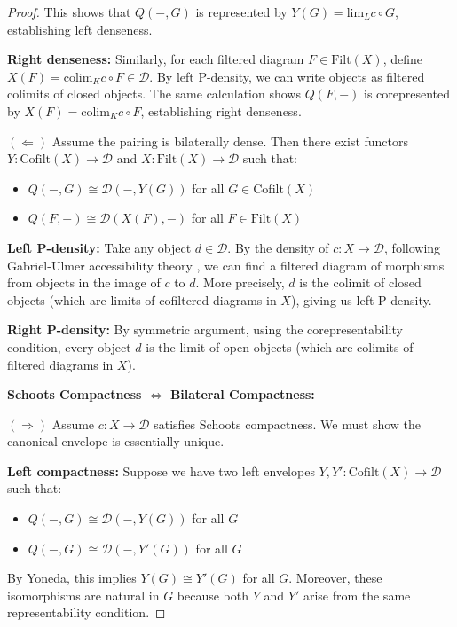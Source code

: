 \documentclass[11pt]{article}
\theoremstyle{plain}
\theoremstyle{definition}
\theoremstyle{remark}
\newcommand{\colim}{\mathrm{colim}}
\renewcommand{\lim}{\mathrm{lim}}
\begin{document}
\begin{proof}
This shows that $Q(-, G)$ is represented by $Y(G) = \lim_L c \circ G$, establishing left denseness.

\textbf{Right denseness:} Similarly, for each filtered diagram $F \in \mathrm{Filt}(X)$, define $X(F) = \colim_K c \circ F \in \mathcal{D}$. By left P-density, we can write objects as filtered colimits of closed objects. The same calculation shows $Q(F, -)$ is corepresented by $X(F) = \colim_K c \circ F$, establishing right denseness.

$(\Leftarrow)$ Assume the pairing is bilaterally dense. Then there exist functors $Y : \mathrm{Cofilt}(X) \to \mathcal{D}$ and $X : \mathrm{Filt}(X) \to \mathcal{D}$ such that:
\begin{itemize}
\item $Q(-, G) \cong \mathcal{D}(-, Y(G))$ for all $G \in \mathrm{Cofilt}(X)$
\item $Q(F, -) \cong \mathcal{D}(X(F), -)$ for all $F \in \mathrm{Filt}(X)$
\end{itemize}

\textbf{Left P-density:} Take any object $d \in \mathcal{D}$. By the density of $c : X \to \mathcal{D}$, following Gabriel-Ulmer accessibility theory \cite{gabriel1971lokal}, we can find a filtered diagram of morphisms from objects in the image of $c$ to $d$. More precisely, $d$ is the colimit of closed objects (which are limits of cofiltered diagrams in $X$), giving us left P-density.

\textbf{Right P-density:} By symmetric argument, using the corepresentability condition, every object $d$ is the limit of open objects (which are colimits of filtered diagrams in $X$).

\textbf{Schoots Compactness $\Leftrightarrow$ Bilateral Compactness:}

$(\Rightarrow)$ Assume $c : X \to \mathcal{D}$ satisfies Schoots compactness. We must show the canonical envelope is essentially unique.

\textbf{Left compactness:} Suppose we have two left envelopes $Y, Y' : \mathrm{Cofilt}(X) \to \mathcal{D}$ such that:
\begin{itemize}
\item $Q(-, G) \cong \mathcal{D}(-, Y(G))$ for all $G$
\item $Q(-, G) \cong \mathcal{D}(-, Y'(G))$ for all $G$  
\end{itemize}

By Yoneda, this implies $Y(G) \cong Y'(G)$ for all $G$. Moreover, these isomorphisms are natural in $G$ because both $Y$ and $Y'$ arise from the same representability condition.


\end{proof}
\end{document}
